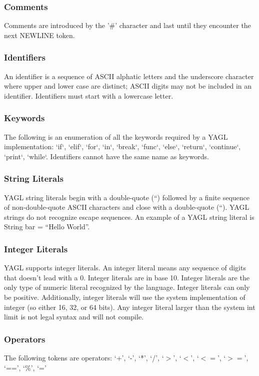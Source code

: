 \documentclass[12pt]{article}
\begin{document}
\subsubsection{Comments} 
Comments are introduced by the '\#' character and last until they encounter the next NEWLINE token.

\subsubsection{Identifiers}
An identifier is a sequence of ASCII alphatic letters and the underscore character where upper and lower case are distinct; ASCII digits may not be included in an identifier.  Identifiers must start with a lowercase letter.

\subsubsection{Keywords}
The following is an enumeration of all the keywords required by a YAGL implementation:
`if`, `elif`, `for`, `in`, `break`, `func`, `else`, `return`, `continue`, `print`, `while`.  Identifiers cannot have the same name as keywords.

\subsubsection{String Literals}
YAGL string literals begin with a double-quote (“) followed by a finite sequence of non-double-quote ASCII characters and close with a double-quote (“). YAGL strings do not recognize escape sequences. An example of a YAGL string literal is String bar = “Hello World”.

\subsubsection{Integer Literals}
YAGL supports integer literals.  An integer literal means any sequence of digits that doesn’t lead with a 0.  Integer literals are in base 10.  Integer literals are the only type of numeric literal recognized by the language.  Integer literals can only be positive.  Additionally, integer literals will use the system implementation of integer (so either 16, 32, or 64 bits).  Any integer literal larger than the system int limit is not legal syntax and will not compile.

\subsubsection{Operators}
The following tokens are operators:
‘+’, ‘-’, ‘*’, ‘/’, ‘$>$’, ‘$<$’, ‘$<=$’, ‘$>=$’, ‘==’, ‘$\%$’, ‘=’
\end{document}
